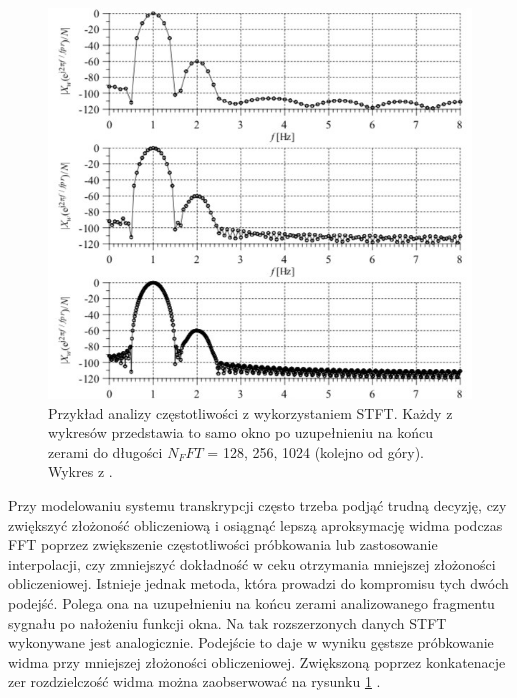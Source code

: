 \documentclass[12pt,a4paper,twoside]{mwart}
\begin{document}
\begin{figure}[t]
  \begin{center}
    \includegraphics[scale=0.7]{images/ZeroPadding.jpg}
    \caption{Przykład analizy częstotliwości z wykorzystaniem STFT. Każdy z wykresów przedstawia to samo okno po uzupełnieniu na końcu zerami do długości $N_FFT$ = 128, 256, 1024 (kolejno od góry). Wykres z 
    \cite[224]{CyfrowePrzetwarzanieSygnalowOdTeoriiDoZastosowan}.
    }
    \label{fig:ZeroPadding}
  \end{center}
\end{figure}

Przy modelowaniu systemu transkrypcji często trzeba podjąć trudną decyzję, czy zwiększyć złożoność obliczeniową i osiągnąć lepszą aproksymację widma podczas FFT poprzez zwiększenie częstotliwości próbkowania lub zastosowanie interpolacji, czy zmniejszyć dokładność w ceku otrzymania mniejszej złożoności obliczeniowej. Istnieje jednak metoda, która prowadzi do kompromisu tych dwóch podejść. Polega ona na uzupełnieniu na końcu zerami analizowanego fragmentu sygnału po nałożeniu funkcji okna. Na tak rozszerzonych danych STFT wykonywane jest analogicznie. Podejście to daje w wyniku gęstsze próbkowanie widma przy mniejszej złożoności obliczeniowej. Zwiększoną poprzez konkatenacje zer rozdzielczość widma można zaobserwować na rysunku \ref{fig:ZeroPadding} 
\cite[221-224]{CyfrowePrzetwarzanieSygnalowOdTeoriiDoZastosowan}.
\end{document}
